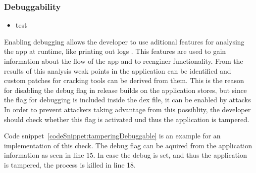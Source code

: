 \subsubsection{Debuggability} \label{subsection:section:counter-improve-tampering-debuggable}
\begin{itemize}
    \item test
\end{itemize}
Enabling debugging allows the developer to use aditional features for analysing the app at runtime, like printing out logs \cite{androidDebugging}.
This features are used to gain information about the flow of the app and to reenginer functionality.
From the results of this analysis weak points in the application can be identified and custom patches for cracking tools can be derived from them.
This is the reason for disabling the debug flag in release builds on the application stores, but since the flag for debugging is included inside the \gls{dex} file, it can be enabled by attacks
In order to prevent attackers taking advantage from this possiblity, the developer should check whether this flag is activated und thus the application is tampered.
\newline

Code snippet~\ref{codeSnippet:tamperingDebuggable} is an example for an implementation of this check.
The debug flag can be aquired from the application information as seen in line 15.
In case the debug is set, and thus the application is tampered, the process is killed in line 18.
